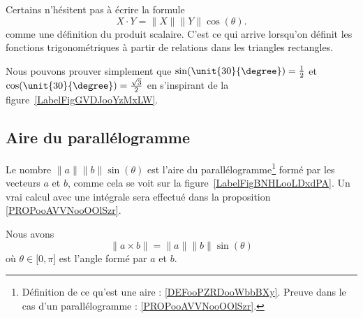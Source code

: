 \begin{normaltext}
	Certains n'hésitent pas à écrire la formule
	\begin{equation}		\label{eqPropCosThet}
		X\cdot Y=\| X \|\| Y \|\cos(\theta).
	\end{equation}
	comme une définition du produit scalaire. C'est ce qui arrive lorsqu'on définit les fonctions trigonométriques à partir de relations dans les triangles rectangles.
\end{normaltext}

Nous pouvons prouver simplement que \( \sin(\unit{30}{\degree})=\frac{ 1 }{2}\) et \( \cos(\unit{30}{\degree})=\frac{ \sqrt{3} }{2}\) en s'inspirant de la figure~\ref{LabelFigGVDJooYzMxLW}. %
\newcommand{\CaptionFigGVDJooYzMxLW}{Un triangle équilatéral de côté \( 1\).}


\subsection{Aire du parallélogramme}

\newcommand{\CaptionFigBNHLooLDxdPA}{Calculer l'aire d'un parallélogramme.}


\begin{remark}      \label{RemaAireParalProdVect}
	Le nombre \( \| a \|\| b \|\sin(\theta)\) est l'aire du parallélogramme\footnote{Définition de ce qu'est une aire : \ref{DEFooPZRDooWbbBXy}. Preuve dans le cas d'un parallélogramme : \ref{PROPooAVVNooOOlSzr}.} formé par les vecteurs \( a\) et \( b\), comme cela se voit sur la figure~\ref{LabelFigBNHLooLDxdPA}. Un vrai calcul avec une intégrale sera effectué dans la proposition \ref{PROPooAVVNooOOlSzr}.
\end{remark}

\begin{proposition}     \label{PropNormeProdVectoabsint}
	Nous avons
	\begin{equation}
		\| a\times b \|=\| a \|\| b \|\sin(\theta)
	\end{equation}
	où \( \theta\in\mathopen[ 0,\pi \mathclose]\) est l'angle formé par \( a\) et \( b\).
\end{proposition}

